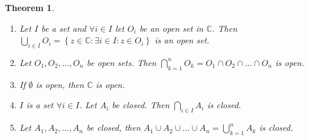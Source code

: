 \documentclass[a4paper,landscape,twocolumn]{article}
\newtheorem{theorem}{Theorem}
\newcommand\set[1]{\left\{#1\right\}}
\begin{document}
\begin{theorem}
  \begin{enumerate}
    \item
      Let $I$ be a set and $\forall i \in I$ let $O_i$ be an open set in $\mathbb C$.
      Then $\bigcup_{i \in I} O_i = \set{z \in \mathbb C: \exists i \in I: z \in O_i}$
      is an open set.
    \item
      Let $O_1, O_2, \ldots, O_n$ be open sets.
      Then $\bigcap_{k=1}^n O_k = O_1 \cap O_2 \cap \ldots \cap O_n$ is open.
    \item
      If $\emptyset$ is open, then $\mathbb C$ is open.
    \item
      $I$ is a set $\forall i \in I$. Let $A_i$ be closed.
      Then $\bigcap_{i\in I} A_i$ is closed.
    \item
      Let $A_1, A_2, \dots, A_n$ be closed, then
      $A_1 \cup A_2 \cup \dots \cup A_n = \bigcup_{k=1}^n A_k$ is closed.
  \end{enumerate}
\end{theorem}
\end{document}
